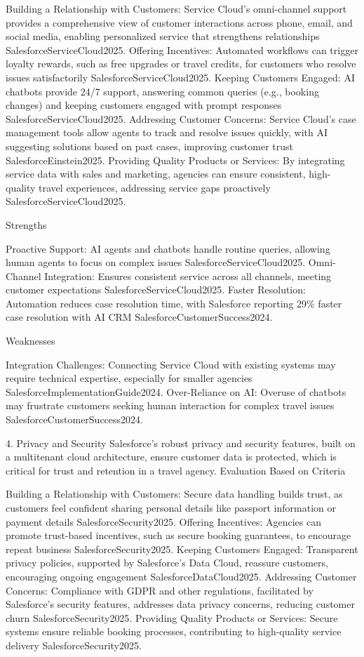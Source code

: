 Building a Relationship with Customers: Service Cloud’s omni-channel support provides a comprehensive view of customer interactions across phone, email, and social media, enabling personalized service that strengthens relationships {SalesforceServiceCloud2025}.
Offering Incentives: Automated workflows can trigger loyalty rewards, such as free upgrades or travel credits, for customers who resolve issues satisfactorily {SalesforceServiceCloud2025}.
Keeping Customers Engaged: AI chatbots provide 24/7 support, answering common queries (e.g., booking changes) and keeping customers engaged with prompt responses {SalesforceServiceCloud2025}.
Addressing Customer Concerns: Service Cloud’s case management tools allow agents to track and resolve issues quickly, with AI suggesting solutions based on past cases, improving customer trust {SalesforceEinstein2025}.
Providing Quality Products or Services: By integrating service data with sales and marketing, agencies can ensure consistent, high-quality travel experiences, addressing service gaps proactively {SalesforceServiceCloud2025}.

Strengths

Proactive Support: AI agents and chatbots handle routine queries, allowing human agents to focus on complex issues {SalesforceServiceCloud2025}.
Omni-Channel Integration: Ensures consistent service across all channels, meeting customer expectations {SalesforceServiceCloud2025}.
Faster Resolution: Automation reduces case resolution time, with Salesforce reporting 29\% faster case resolution with AI CRM {SalesforceCustomerSuccess2024}.

Weaknesses

Integration Challenges: Connecting Service Cloud with existing systems may require technical expertise, especially for smaller agencies {SalesforceImplementationGuide2024}.
Over-Reliance on AI: Overuse of chatbots may frustrate customers seeking human interaction for complex travel issues {SalesforceCustomerSuccess2024}.

4. Privacy and Security
Salesforce’s robust privacy and security features, built on a multitenant cloud architecture, ensure customer data is protected, which is critical for trust and retention in a travel agency.
Evaluation Based on Criteria

Building a Relationship with Customers: Secure data handling builds trust, as customers feel confident sharing personal details like passport information or payment details {SalesforceSecurity2025}.
Offering Incentives: Agencies can promote trust-based incentives, such as secure booking guarantees, to encourage repeat business {SalesforceSecurity2025}.
Keeping Customers Engaged: Transparent privacy policies, supported by Salesforce’s Data Cloud, reassure customers, encouraging ongoing engagement {SalesforceDataCloud2025}.
Addressing Customer Concerns: Compliance with GDPR and other regulations, facilitated by Salesforce’s security features, addresses data privacy concerns, reducing customer churn {SalesforceSecurity2025}.
Providing Quality Products or Services: Secure systems ensure reliable booking processes, contributing to high-quality service delivery {SalesforceSecurity2025}.

